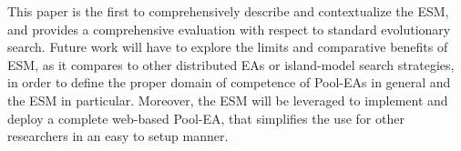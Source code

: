 This paper is the first to comprehensively describe and contextualize the ESM, and provides a comprehensive evaluation with respect to standard evolutionary search.
Future work will have to explore the limits and comparative benefits of ESM, as it compares to other distributed EAs or island-model search strategies,
in order to define the proper domain of competence of Pool-EAs in general and the ESM in particular.
Moreover, the ESM will be leveraged to implement and deploy a complete web-based Pool-EA, that simplifies the use for other researchers in an easy to setup manner.





% 





